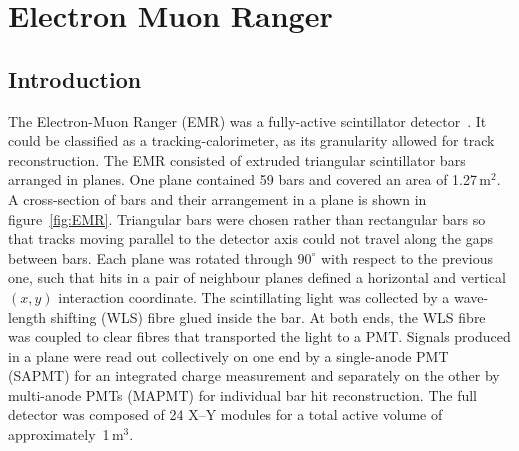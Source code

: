 \graphicspath{{05-EMR/Figures/}}

\section{Electron Muon Ranger}
\label{Sect:EMR}

\subsection{Introduction}
\label{SubSect:EMR_Intro}

The Electron-Muon Ranger (EMR) was a fully-active scintillator detector~\cite{2016JInst..11T10007}. It could be classified as a tracking-calorimeter, as its granularity allowed for track reconstruction. The EMR consisted of extruded triangular scintillator bars arranged in planes. One plane contained 59 bars and covered an area of 1.27\,m$^2$.
A cross-section of bars and their arrangement in a plane is shown in figure~\ref{fig:EMR}.
Triangular bars were chosen rather than rectangular bars so that tracks moving parallel to the detector axis could not travel along the gaps between bars.
Each plane was rotated through $90^{\circ}$ with respect to the previous one, such that hits in a pair of neighbour planes defined a horizontal and vertical $(x, y)$ interaction coordinate. The scintillating light was collected by a wave-length shifting (WLS) fibre glued inside the bar. At both ends, the WLS fibre was coupled to clear fibres that transported the light to a PMT. Signals produced in a plane were read out collectively on one end by a single-anode PMT (SAPMT) for an integrated charge measurement and separately on the other by multi-anode PMTs (MAPMT) for individual bar hit reconstruction. The full detector was composed of 24 X--Y modules for a total active volume of approximately~1\,m$^3$.

